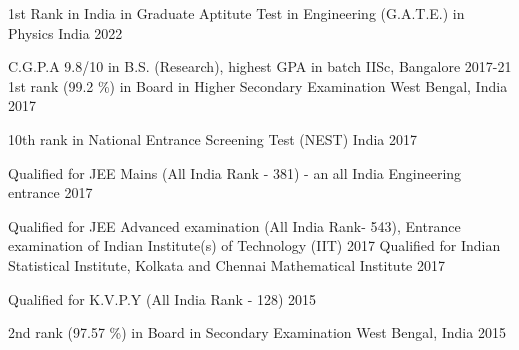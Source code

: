 




\begin{cvhonors}

 \cvhonor
{1st Rank in India} %
{in Graduate Aptitute Test in Engineering (G.A.T.E.) in Physics} %
{India} %
{2022} %

  \cvhonor
{C.G.P.A} %
{9.8/10 in B.S. (Research), highest GPA in batch} %
{IISc, Bangalore} %
{2017-21} %
  \cvhonor
    {1st rank (99.2 \%) in Board} %
    {in Higher Secondary Examination} %
    {West Bengal, India} %
    {2017} %

  \cvhonor
    {} %
    {10th rank in National Entrance Screening Test (NEST)} %
    {India} %
    {2017} %

  \cvhonor
	{} %
	{Qualified for JEE Mains (All India Rank - 381) - an all India Engineering entrance} %
	{} %
	{2017} %
	 
	\cvhonor
	{} %
	{Qualified for JEE Advanced examination (All India Rank- 543), Entrance examination of Indian Institute(s) of Technology (IIT)} %
	{} %
	{2017} %
  \cvhonor
    {} %
    {Qualified for Indian Statistical Institute, Kolkata and Chennai Mathematical Institute} %
    {} %
    {2017} %

  \cvhonor
    {} %
    {Qualified for K.V.P.Y (All India Rank - 128)} %
    {} %
    {2015} %

  \cvhonor
    {2nd rank (97.57 \%) in Board} %
    {in Secondary Examination} %
    {West Bengal, India} %
    {2015} %

\end{cvhonors}

